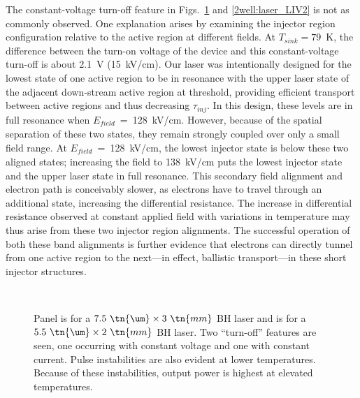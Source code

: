 The constant-voltage turn-off feature in Figs.~\ref{2well:laser_LIV} and \ref{2well:laser_LIV2} is not as commonly observed.  One explanation arises by examining the injector region configuration relative to the active region at different fields.  At $T_{sink}=79$~K, the difference between the turn-on voltage of the device and this constant-voltage turn-off is about 2.1~V (15~kV/cm).  Our laser was intentionally designed for the lowest state of one active region to be in resonance with the upper laser state of the adjacent down-stream active region at threshold, providing efficient transport between active regions and thus decreasing $\tau_\textit{inj}$.  In this design, these levels are in full resonance when $E_\textit{field}$~=~128~kV/cm.  However, because of the spatial separation of these two states, they remain strongly coupled over only a small field range.  At $E_\textit{field}$~=~128~kV/cm, the lowest injector state is below these two aligned states; increasing the field to 138~kV/cm puts the lowest injector state and the upper laser state in full resonance.  This secondary field alignment and electron path is conceivably slower, as electrons have to travel through an additional state, increasing the differential resistance.  The increase in differential resistance observed at constant applied field with variations in temperature may thus arise from these two injector region alignments.  The successful operation of both these band alignments is further evidence that electrons can directly tunnel from one active region to the next---in effect, ballistic transport---in these short injector structures.

\begin{figure}[tp]%
\centering%
%
\\%
%
\caption[Pulsed LIV data for the two injector well structure (I)]{ Panel  is for a $7.5~\tn{\um}\times3~\tn{mm}$ BH laser and  is for a $5.5~\tn{\um}\times2~\tn{mm}$ BH laser.  Two ``turn-off'' features are seen, one occurring with constant voltage and one with constant current.  Pulse instabilities are also evident at lower temperatures.  Because of these instabilities, output power is highest at elevated temperatures.}
\label{2well:laser_LIV}
\end{figure}

